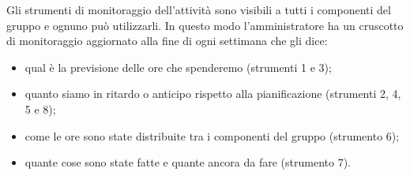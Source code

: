 \noindent Gli strumenti di monitoraggio dell'attività sono visibili a tutti i componenti del gruppo e ognuno può utilizzarli. In questo modo l'amministratore ha un cruscotto di monitoraggio aggiornato alla fine di ogni settimana che gli dice:
\begin{itemize}
	\item qual è la previsione delle ore che spenderemo (strumenti 1 e 3);
	\item quanto siamo in ritardo o anticipo rispetto alla pianificazione (strumenti 2, 4, 5 e 8);
	\item come le ore sono state distribuite tra i componenti del gruppo (strumento 6);
	\item quante cose sono state fatte e quante ancora da fare (strumento 7).
\end{itemize}


